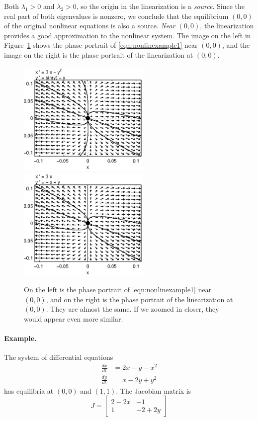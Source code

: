 \documentclass[reqno]{immbook}
\begin{document}
Both $\lambda_1>0$ and $\lambda_2>0$, so the origin
in the linearization is a \emph{source}.
Since the real part of both eigenvalues is nonzero,
we conclude that the equilibrium $(0,0)$ of the original
nonlinear equations is also a source.
\emph{Near $(0,0)$}, the linearization provides a
good approximation to the nonlinear system.
The image on the left in Figure~\ref{fig:nonlinexample1compare}
shows the phase portrait of \eqref{eqn:nonlinexample1}
near $(0,0)$, and the image on the right
is the phase portrait of the linearization at $(0,0)$.
\begin{figure}
\centerline{%
\includegraphics[width=2.5in]{pplane_plots/NonlinExample1detail.ps}
\includegraphics[width=2.5in]{pplane_plots/NonlinExample1lin.ps}
}
\caption{On the left is the phase portrait of
\eqref{eqn:nonlinexample1} near $(0,0)$, and on the
right is the phase portrait of the linearization
at $(0,0)$.  They are almost the same.  If we zoomed
in closer, they would appear even more similar.}
\label{fig:nonlinexample1compare}
\end{figure}
%
%
\paragraph{Example.}
The system of differential equations
\begin{equation}
\begin{split}
  \frac{dx}{dt} & = 2x - y -x^2 \\
  \frac{dy}{dt} & = x - 2y + y^2
\end{split}
\end{equation}
has equilibria at $(0,0)$ and $(1,1)$.
The Jacobian matrix is
\begin{equation}
  J = \begin{bmatrix}
           2-2x & -1 \\
	   1 & -2 + 2y
      \end{bmatrix}
\end{equation}
\end{document}

